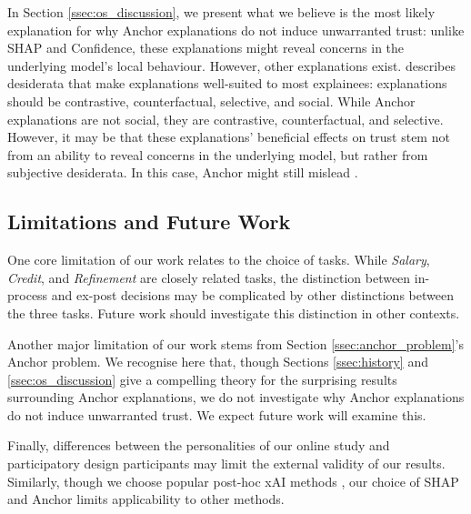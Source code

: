 In Section \ref{ssec:os_discussion}, we present what we believe is the most likely explanation for why Anchor explanations do not induce unwarranted trust: unlike SHAP and Confidence, these explanations might reveal concerns in the underlying model's local behaviour. However, other explanations exist. \textcite{miller_explanation_2017} describes desiderata that make explanations well-suited to most explainees: explanations should be contrastive, counterfactual, selective, and social. While Anchor explanations are not social, they are contrastive, counterfactual, and selective. However, it may be that these explanations' beneficial effects on trust stem not from an ability to reveal concerns in the underlying model, but rather from subjective desiderata. In this case, Anchor might still mislead \cite{Lipton}.

\subsection{Limitations and Future Work}
One core limitation of our work relates to the choice of tasks. While \emph{Salary}, \emph{Credit}, and \emph{Refinement} are closely related tasks, the distinction between in-process and ex-post decisions may be complicated by other distinctions between the three tasks. Future work should investigate this distinction in other contexts.

Another major limitation of our work stems from Section \ref{ssec:anchor_problem}'s Anchor problem. We recognise here that, though Sections \ref{ssec:history} and \ref{ssec:os_discussion} give a compelling theory for the surprising results surrounding Anchor explanations, we do not investigate why Anchor explanations do not induce unwarranted trust. We expect future work will examine this.

Finally, differences between the personalities of our online study and participatory design participants may limit the external validity of our results. Similarly, though we choose popular post-hoc xAI methods \cite{barocas_hidden_2020,kumar_problems_2020,weerts_human-grounded_2019,ribeiro_nothing_2016}, our choice of SHAP and Anchor limits applicability to other methods.

